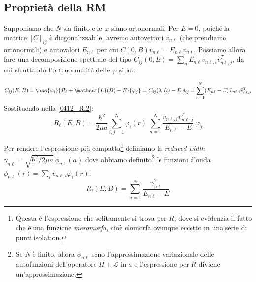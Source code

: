 \subsection{Proprietà della RM}
Supponiamo che $N$ sia finito e le $\varphi$ siano ortonormali. Per $E=0$, poiché la matrice $[C]_{ij}$ è diagonalizzabile, avremo autovettori $\bar{v}_{n\ell}$ (che prendiamo ortonormali) e autovalori $E_{n\ell}$ per cui $C(0,B)\bar{v}_{n\ell} = E_{n\ell} \bar{v}_{n\ell}$. Possiamo allora fare una decomposizione spettrale del tipo $C_{ij}(0,B) = \sum_n E_{n\ell} \bar{v}_{n\ell,i} \bar{v}^T_{n\ell,j}$, da cui sfruttando l'ortonormalità delle $\varphi$ si ha:

$$ C_{ij}(E,B) = \oss{\varphi_i}{H_\ell + \mathscr{L}(B) - E}{\varphi_j} = C_{ij}(0,B) - E\: \delta_{ij} = \sum_{n=1}^N (E_{n\ell} - E)\, \bar{v}_{n\ell,i}\bar{v}^T_{n\ell,j}$$
Sostituendo nella \eqref{0412_Rl2}:
$$R_\ell (E,B) = \frac{\hbar^2}{2\mu a} \sum_{i,j =1}^N \varphi_i(r) \: \sum_{n=1}^{N} \frac{\bar{v}_{n\ell,i}\bar{v}^T_{n\ell,j}}{E_{n\ell}-E} \: \varphi_j$$ 

\noindent Per rendere l'espressione più compatta\footnote{Questa è l'espressione che solitamente si trova per $R$, dove si evidenzia il fatto che è una funzione \textit{meromorfa}, cioè olomorfa ovunque eccetto in una serie di punti isolation.} definiamo la \textit{reduced width} $\gamma_{n\ell} = \sqrt{\hbar^2/2\mu a} \: \phi_{n\ell}(a)$ dove abbiamo definito\footnote{Se $N$ è finito, allora $\phi_{n\ell}$ sono l'approssimazione variazionale delle autofunzioni dell'operatore $H+\mathscr{L}$ in $a$ e l'espressione per $R$ diviene un'approssimazione.} le funzioni d'onda $\phi_{n\ell}(r) = \sum_i \bar{v}_{n\ell,i}\varphi_i(r)$:
\begin{equation}\label{0412_Rl3}
R_\ell (E,B) = \sum_{n=1}^N \frac{\gamma_{n\ell}^2}{E_{n\ell}-E}	
\end{equation}

